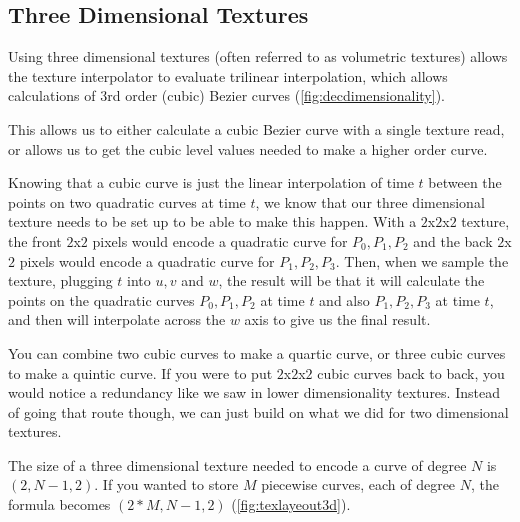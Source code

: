 \documentclass{jcgt}
\begin{document}
\subsection{Three Dimensional Textures}

Using three dimensional textures (often referred to as volumetric textures) allows the texture interpolator to evaluate trilinear interpolation, which allows calculations of 3rd order (cubic) Bezier curves (\autoref{fig:decdimensionality}).

This allows us to either calculate a cubic Bezier curve with a single texture read, or allows us to get the cubic level values needed to make a higher order curve.

Knowing that a cubic curve is just the linear interpolation of time $t$ between the points on two quadratic curves at time $t$, we know that our three dimensional texture needs to be set up to be able to make this happen.  With a $2$x$2$x$2$ texture, the front $2$x$2$ pixels would encode a quadratic curve for $P_0,P_1,P_2$ and the back $2$x$2$ pixels would encode a quadratic curve for $P_1,P_2,P_3$.  Then, when we sample the texture, plugging $t$ into $u,v$ and $w$, the result will be that it will calculate the points on the quadratic curves $P_0,P_1,P_2$ at time $t$ and also $P_1,P_2,P_3$ at time $t$, and then will interpolate across the $w$ axis to give us the final result.

You can combine two cubic curves to make a quartic curve, or three cubic curves to make a quintic curve.  If you were to put $2$x$2$x$2$ cubic curves back to back, you would notice a redundancy like we saw in lower dimensionality textures.  Instead of going that route though, we can just build on what we did for two dimensional textures.

The size of a three dimensional texture needed to encode a curve of degree $N$ is $(2,N-1,2)$.  If you wanted to store $M$ piecewise curves, each of degree $N$, the formula becomes $(2*M,N-1,2)$ (\autoref{fig:texlayeout3d}).
\end{document}
